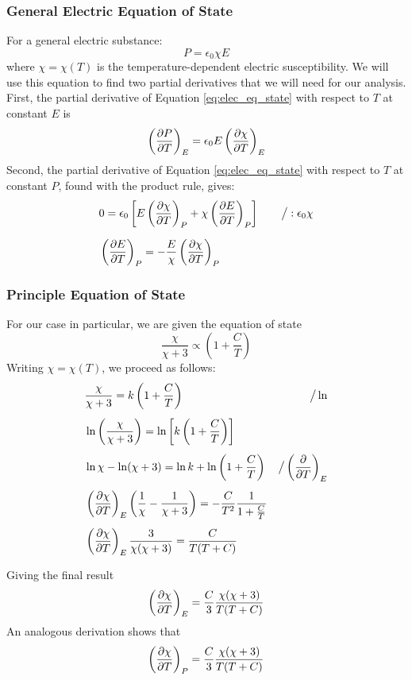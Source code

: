 \documentclass[11pt, a4paper]{article}
\begin{document}
\subsubsection*{General Electric Equation of State}
For a general electric substance:
\begin{equation}
	P = \epsilon_0 \chi E \label{eq:elec_eq_state}
\end{equation}
where $ \chi = \chi(T)$ is the temperature-dependent electric susceptibility. We will use this equation to find two partial derivatives that we will need for our analysis. First, the partial derivative of Equation \ref{eq:elec_eq_state} with respect to $ T $ at constant $ E $ is
\begin{equation}
	\left(\pdv{P}{T}\right)_E = \epsilon_0 E \left(\pdv{\chi}{T}\right)_E \label{eq:pdv_P_T_E}
\end{equation}
Second, the partial derivative of Equation \ref{eq:elec_eq_state} with respect to $ T $ at constant $ P $, found with the product rule, gives:
\begin{align}
	&0 = \epsilon_0 \left[E \left(\pdv{\chi}{T}\right)_P + \chi \left(\pdv{E}{T}\right)_P \right] \qquad \big / : \epsilon_0 \chi \nonumber \\[1.5ex]
	&\left(\pdv{E}{T}\right)_P = - \frac{E}{\chi} \left(\pdv{\chi}{T}\right)_P \label{eq:pdv_E_T_P}
\end{align}

\subsubsection*{Principle Equation of State}
For our case in particular, we are given the equation of state
\begin{equation*}
	\frac{\chi}{\chi + 3} \propto \left( 1 + \frac{C}{T}\right) 
\end{equation*}
Writing $ \chi = \chi(T) $, we proceed as follows:
\begin{align*}
	&\frac{\chi}{\chi + 3} = k\left( 1 + \frac{C}{T}\right) & \big / \ln &\\[1.0ex]
	&\ln \left(\frac{\chi}{\chi + 3}\right) = \ln \left[ k  \left( 1 + \frac{C}{T}\right) \right]\\[1.0ex]
	& \ln \chi - \ln(\chi + 3) = \ln k + \ln \left( 1 + \frac{C}{T}\right) & \big / \left(\pdv{}{T}\right)_E \\[1.0ex]
	& \left(\pdv{\chi}{T}\right)_E \left(\frac{1}{\chi} - \frac{1}{\chi + 3}\right) = -\frac{C}{T^2} \frac{1}{1 + \frac{C}{T}}\\[1.0ex]
	&\left(\pdv{\chi}{T}\right)_E \frac{3}{\chi (\chi + 3)} = \frac{C}{T(T + C)}\\[1.0ex]
\end{align*}
Giving the final result
\begin{equation}
	\left(\pdv{\chi}{T}\right)_E = \frac{C}{3} \frac{ \chi (\chi + 3)}{T(T + C)}\label{eq:pdv_chi_T_E}
\end{equation}
An analogous derivation shows that
\begin{equation}
	\left(\pdv{\chi}{T}\right)_P = \frac{C}{3} \frac{ \chi (\chi + 3)}{T(T + C)} \label{eq:pdv_chi_T_P}
\end{equation}
\end{document}
